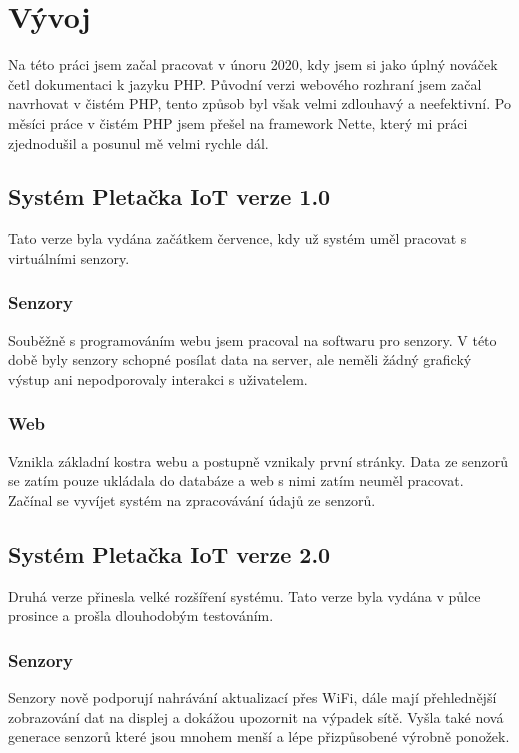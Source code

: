 \chapter{Vývoj}
Na této práci jsem začal pracovat v únoru 2020, kdy jsem si jako úplný nováček četl dokumentaci k jazyku PHP. 
Původní verzi webového rozhraní jsem začal navrhovat v čistém PHP, tento způsob byl však velmi zdlouhavý a neefektivní.
Po měsíci práce v čistém PHP jsem přešel na framework Nette, který mi práci zjednodušil a posunul mě velmi rychle dál. 


\section{Systém Pletačka IoT verze 1.0}
Tato verze byla vydána začátkem července, kdy už systém uměl pracovat s virtuálními senzory.


\subsection{Senzory}
Souběžně s programováním webu jsem pracoval na softwaru pro senzory.
V této době byly senzory schopné posílat data na server, ale neměli žádný grafický výstup ani nepodporovaly interakci s uživatelem.

\subsection{Web}
Vznikla základní kostra webu a postupně vznikaly první stránky.
Data ze senzorů se zatím pouze ukládala do databáze a web s nimi zatím neuměl pracovat.
Začínal se vyvíjet systém na zpracovávání údajů ze senzorů.



\section{Systém Pletačka IoT verze 2.0}
Druhá verze přinesla velké rozšíření systému.
Tato verze byla vydána v půlce prosince a prošla dlouhodobým testováním.


\subsection{Senzory}
Senzory nově podporují nahrávání aktualizací přes WiFi, dále mají přehlednější zobrazování dat na displej a dokážou upozornit na výpadek sítě.
Vyšla také nová generace senzorů které jsou mnohem menší a lépe přizpůsobené výrobně ponožek.

